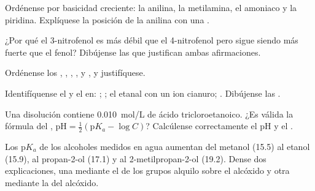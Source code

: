 \begin{exercise}[$\star\star$]\label{exo:b1:electronic-effects:6}
Ordénense por basicidad creciente: la anilina, la metilamina, el
amoniaco y la piridina. Explíquese la posición de la anilina con una
.
\end{exercise}

\begin{exercise}[$\star\star$]\label{exo:b1:electronic-effects:7}
¿Por qué el 3-nitrofenol es más débil que el 4-nitrofenol pero sigue
siendo más fuerte que el fenol? Dibújense las  que
justifican ambas afirmaciones.
\end{exercise}

\begin{exercise}[$\star\star$]\label{exo:b1:electronic-effects:8}
Ordénense los  , , ,
,  y , y justifíquese.
\end{exercise}

\begin{exercise}[$\star\star$]\label{exo:b1:electronic-effects:9}
Identifíquense el  y el  en: ;
; el etanal con un ion cianuro; . Dibújense las
.
\end{exercise}

\begin{exercise}[$\star\star\star$]\label{exo:b1:electronic-effects:10}
Una disolución contiene \qty{0.010}{mol/L} de ácido tricloroetanoico. ¿Es
válida la fórmula del ,
$\mathrm{pH} = \frac12(\mathrm{p}K_a - \log C)$? Calcúlense correctamente
el pH y el .
\end{exercise}

\begin{exercise}[$\star\star\star$]\label{exo:b1:electronic-effects:11}
Los $\mathrm{p}K_a$ de los alcoholes medidos en agua aumentan del metanol
(15.5) al etanol (15.9), al propan-2-ol (17.1) y al 2-metilpropan-2-ol
(19.2). Dense dos explicaciones, una mediante el  de los
grupos alquilo sobre el alcóxido y otra mediante la  del
alcóxido.
\end{exercise}

